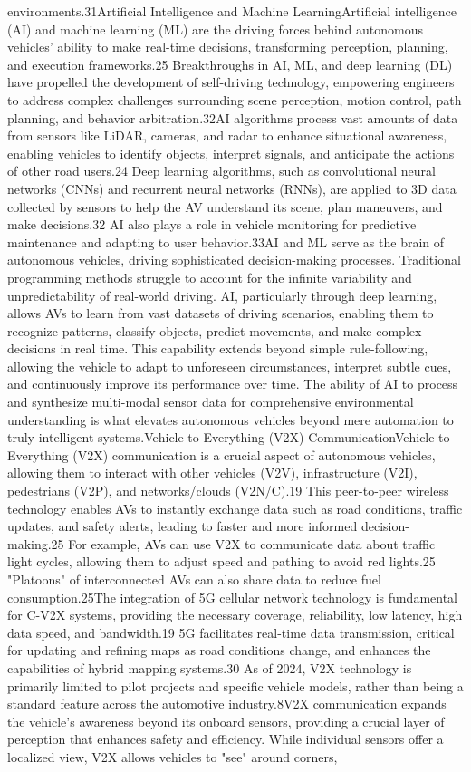 environments.31Artificial Intelligence and Machine LearningArtificial intelligence (AI) and machine learning (ML) are the driving forces behind autonomous vehicles' ability to make real-time decisions, transforming perception, planning, and execution frameworks.25 Breakthroughs in AI, ML, and deep learning (DL) have propelled the development of self-driving technology, empowering engineers to address complex challenges surrounding scene perception, motion control, path planning, and behavior arbitration.32AI algorithms process vast amounts of data from sensors like LiDAR, cameras, and radar to enhance situational awareness, enabling vehicles to identify objects, interpret signals, and anticipate the actions of other road users.24 Deep learning algorithms, such as convolutional neural networks (CNNs) and recurrent neural networks (RNNs), are applied to 3D data collected by sensors to help the AV understand its scene, plan maneuvers, and make decisions.32 AI also plays a role in vehicle monitoring for predictive maintenance and adapting to user behavior.33AI and ML serve as the brain of autonomous vehicles, driving sophisticated decision-making processes. Traditional programming methods struggle to account for the infinite variability and unpredictability of real-world driving. AI, particularly through deep learning, allows AVs to learn from vast datasets of driving scenarios, enabling them to recognize patterns, classify objects, predict movements, and make complex decisions in real time. This capability extends beyond simple rule-following, allowing the vehicle to adapt to unforeseen circumstances, interpret subtle cues, and continuously improve its performance over time. The ability of AI to process and synthesize multi-modal sensor data for comprehensive environmental understanding is what elevates autonomous vehicles beyond mere automation to truly intelligent systems.Vehicle-to-Everything (V2X) CommunicationVehicle-to-Everything (V2X) communication is a crucial aspect of autonomous vehicles, allowing them to interact with other vehicles (V2V), infrastructure (V2I), pedestrians (V2P), and networks/clouds (V2N/C).19 This peer-to-peer wireless technology enables AVs to instantly exchange data such as road conditions, traffic updates, and safety alerts, leading to faster and more informed decision-making.25 For example, AVs can use V2X to communicate data about traffic light cycles, allowing them to adjust speed and pathing to avoid red lights.25 "Platoons" of interconnected AVs can also share data to reduce fuel consumption.25The integration of 5G cellular network technology is fundamental for C-V2X systems, providing the necessary coverage, reliability, low latency, high data speed, and bandwidth.19 5G facilitates real-time data transmission, critical for updating and refining maps as road conditions change, and enhances the capabilities of hybrid mapping systems.30 As of 2024, V2X technology is primarily limited to pilot projects and specific vehicle models, rather than being a standard feature across the automotive industry.8V2X communication expands the vehicle's awareness beyond its onboard sensors, providing a crucial layer of perception that enhances safety and efficiency. While individual sensors offer a localized view, V2X allows vehicles to "see" around corners, 